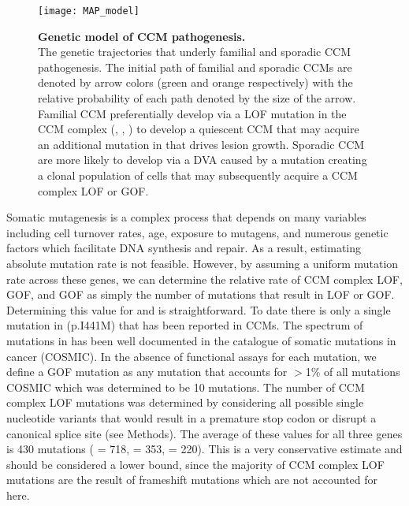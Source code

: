\begin{figure}[h!]
\centering
\texttt{[image: MAP\_model]}
\caption{\textbf{Genetic model of CCM pathogenesis. \\} 
The genetic trajectories that underly familial and sporadic CCM pathogenesis. The initial path of familial and sporadic CCMs are denoted by arrow colors (green and orange respectively) with the relative probability of each path denoted by the size of the arrow. Familial CCM preferentially develop via a LOF mutation in the CCM complex (, , ) to develop a quiescent CCM that may acquire an additional mutation in  that drives lesion growth. Sporadic CCM are more likely to develop via a DVA caused by a  mutation creating a clonal population of cells that may subsequently acquire a CCM complex LOF or  GOF. }

\label{MAP_model}
\end{figure}

Somatic mutagenesis is a complex process that depends on many variables including cell turnover rates, age, exposure to mutagens, and numerous genetic factors which facilitate DNA synthesis and repair. As a result, estimating absolute mutation rate is not feasible. However, by assuming a uniform mutation rate across these genes, we can determine the relative rate of CCM complex LOF,  GOF, and  GOF as simply the number of mutations that result in LOF or GOF. Determining this value for  and  is straightforward. To date there is only a single mutation in  (p.I441M) that has been reported in CCMs. The spectrum of mutations in  has been well documented in the catalogue of somatic mutations in cancer (COSMIC). In the absence of functional assays for each mutation, we define a GOF mutation as any mutation that accounts for $>$1\% of all  mutations COSMIC which was determined to be 10 mutations. The number of CCM complex LOF mutations was determined by considering all possible single nucleotide variants that would result in a premature stop codon or disrupt a canonical splice site (see Methods). The average of these values for all three genes is 430 mutations ( = 718,  = 353,  = 220). This is a very conservative estimate and should be considered a lower bound, since the majority of CCM complex LOF mutations are the result of frameshift mutations which are not accounted for here. 

